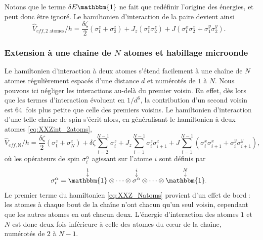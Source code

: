 %
Notons que le terme $\delta E \mathbbm{1}$ ne fait que redéfinir l'origine des énergies, et peut donc être ignoré.
Le hamiltonien d'interaction de la paire devient ainsi
\begin{equation}
\label{eq:XXZint_2atoms}
\hat{V}_{eff,\text{2 atomes}}/h = \frac{\delta\zeta}{2}\left( \sigma_1^z + \sigma_2^z \right)
+ J_z\left( \sigma_1^z \sigma_2^z \right)
+ J \left( \sigma_1^x \sigma_2^x + \sigma_1^y \sigma_2^y \right).
\end{equation}

	\subsubsection*{Extension à une chaîne de $N$ atomes et habillage microonde}
\noindent Le hamiltonien d'interaction à deux atomes s'étend facilement à une chaîne de $N$ atomes régulièrement espacés d'une distance $d$ et numérotés de $1$ à $N$.
Nous pouvons ici négliger les interactions au-delà du premier voisin.
En effet, dès lors que les termes d'interaction évoluent en $1/d^6$, la contribution d'un second voisin est $\SI{64}{}$ fois plus petite que celle des premiers voisins.
Le hamiltonien d'interaction d'une telle chaîne de spin s'écrit alors, en généralisant le hamiltonien à deux atomes \eqref{eq:XXZint_2atoms},
%
\begin{equation}
\label{eq:XXZint_Natoms}
\hat{V}_{eff,\text{N}}/h =
\frac{\delta\zeta}{2} \left( \sigma_1^z + \sigma_N^z \right)
+ \delta\zeta \sum_{i=2}^{N-1} \sigma_i^z
+ J_z \sum_{i=1}^{N-1} \sigma_i^z \sigma_{i+1}^z
+ J \sum_{i=1}^{N-1} \left( \sigma_i^x \sigma_{i+1}^x + \sigma_i^y \sigma_{i+1}^y \right) ,
\end{equation}
%
où les opérateurs de spin $\sigma_i^\alpha$ agissant sur l'atome $i$ sont définis par
%
\begin{equation}
\label{eq:Pauli_Natoms}
\sigma_i^\alpha = \overset{\substack{1\\ \downarrow \\}}{\mathbbm{1}}
\otimes\dots\otimes \overset{\substack{i\\ \downarrow \\}}{\sigma^\alpha}
\otimes\dots\otimes \overset{\substack{N\\ \downarrow \\}}{\mathbbm{1}}.
\end{equation}
%
Le premier terme du hamiltonien \eqref{eq:XXZ_Natoms} provient d'un effet de bord :
les atomes à chaque bout de la chaîne n'ont chacun qu'un seul voisin, cependant que les autres atomes en ont chacun deux.
L'énergie d'interaction des atomes $1$ et $N$ est donc deux fois inférieure à celle des atomes du \og c\oe ur \fg{} de la chaîne, numérotés de $2$ à $N-1$.

